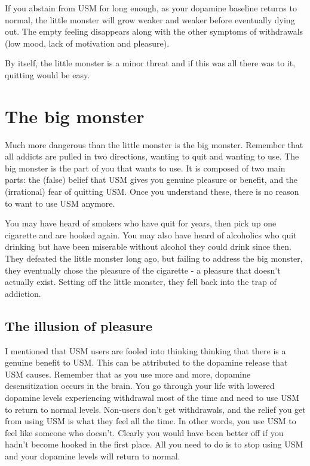 \documentclass[
]{book}
\begin{document}
If you abstain from USM for long enough, as your dopamine baseline returns to normal, the little monster will grow weaker and weaker before eventually dying out. The empty feeling disappears along with the other symptoms of withdrawals (low mood, lack of motivation and pleasure).

By itself, the little monster is a minor threat and if this was all there was to it, quitting would be easy.

\section{The big monster}\label{the-big-monster}

Much more dangerous than the little monster is the big monster. Remember that all addicts are pulled in two directions, wanting to quit and wanting to use. The big monster is the part of you that wants to use. It is composed of two main parts: the (false) belief that USM gives you genuine pleasure or benefit, and the (irrational) fear of quitting USM. Once you understand these, there is no reason to want to use USM anymore.

You may have heard of smokers who have quit for years, then pick up one cigarette and are hooked again. You may also have heard of alcoholics who quit drinking but have been miserable without alcohol they could drink since then. They defeated the little monster long ago, but failing to address the big monster, they eventually chose the pleasure of the cigarette - a pleasure that doesn't actually exist. Setting off the little monster, they fell back into the trap of addiction.

\subsection{The illusion of pleasure}\label{the-illusion-of-pleasure}

I mentioned that USM users are fooled into thinking thinking that there is a genuine benefit to USM. This can be attributed to the dopamine release that USM causes. Remember that as you use more and more, dopamine desensitization occurs in the brain. You go through your life with lowered dopamine levels experiencing withdrawal most of the time and need to use USM to return to normal levels. Non-users don't get withdrawals, and the relief you get from using USM is what they feel all the time. In other words, you use USM to feel like someone who doesn't. Clearly you would have been better off if you hadn't become hooked in the first place. All you need to do is to stop using USM and your dopamine levels will return to normal.
\end{document}
